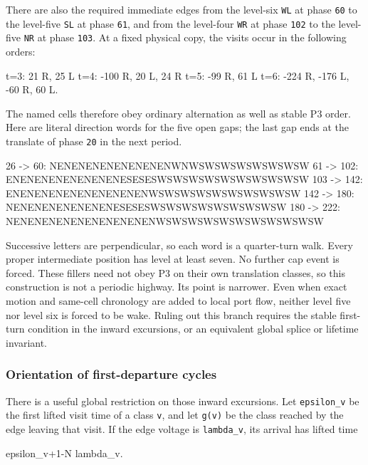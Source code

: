 \documentclass[11pt,letterpaper]{article}
\theoremstyle{plain}
\theoremstyle{definition}
\begin{document}
\begin{NoHyper}
There are also the required immediate edges from the level-six \texttt{WL} at phase \texttt{60} to the level-five \texttt{SL} at phase \texttt{61}, and from the level-four \texttt{WR} at phase \texttt{102} to the level-five \texttt{NR} at phase \texttt{103}. At a fixed physical copy, the visits occur in the following orders:

\begin{codeblock}
t=3:  21 R, 25 L
t=4: -100 R, 20 L, 24 R
t=5:  -99 R, 61 L
t=6: -224 R, -176 L, -60 R, 60 L.
\end{codeblock}

The named cells therefore obey ordinary alternation as well as stable P3 order. Here are literal direction words for the five open gaps; the last gap ends at the translate of phase \texttt{20} in the next period.

\begin{codeblock}
26 ->  60: NENENENENENENENENWNWSWSWSWSWSWSWSW
61 -> 102: ENENENENENENENENESESESWSWSWSWSWSWSWSWSWSW
103 -> 142: ENENENENENENENENENENWSWSWSWSWSWSWSWSWSW
142 -> 180: NENENENENENENENESESESWSWSWSWSWSWSWSWSW
180 -> 222: NENENENENENENENENENENWSWSWSWSWSWSWSWSWSWSW
\end{codeblock}

Successive letters are perpendicular, so each word is a quarter-turn walk. Every proper intermediate position has level at least seven. No further cap event is forced. These fillers need not obey P3 on their own translation classes, so this construction is not a periodic highway. Its point is narrower. Even when exact motion and same-cell chronology are added to local port flow, neither level five nor level six is forced to be wake. Ruling out this branch requires the stable first-turn condition in the inward excursions, or an equivalent global splice or lifetime invariant.

\subsubsection{Orientation of first-departure cycles}

There is a useful global restriction on those inward excursions. Let \texttt{epsilon\_v} be the first lifted visit time of a class \texttt{v}, and let \texttt{g(v)} be the class reached by the edge leaving that visit. If the edge voltage is \texttt{lambda\_v}, its arrival has lifted time

\begin{codeblock}
epsilon_v+1-N lambda_v.
\end{codeblock}


\end{NoHyper}
\end{document}
